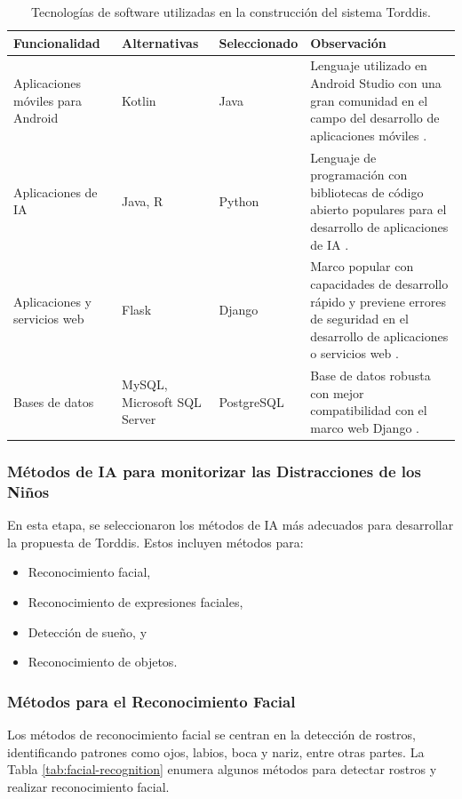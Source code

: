 \documentclass[a4paper,fleqn]{cas-sc}
\begin{document}
	\begin{table}[hbt!]
		\caption{Tecnologías de software utilizadas en la construcción del sistema Torddis.}
		\label{table:software-technologies}
		\centering
		\begin{tabular}{p{}p{}p{}p{}}
			\hline
			\multicolumn{1}{l}{\textbf{Funcionalidad}} & \multicolumn{1}{l}{\textbf{Alternativas }} & \multicolumn{1}{l}{\textbf{Seleccionado}} & \multicolumn{1}{l}{\textbf{Observación}} \\ \hline
			Aplicaciones móviles para Android & Kotlin & Java & Lenguaje utilizado en Android Studio con una gran comunidad en el campo del desarrollo de aplicaciones móviles \citep{Sharma2021Real-Time}. \\
			Aplicaciones de IA & Java, R & Python & Lenguaje de programación con bibliotecas de código abierto populares para el desarrollo de aplicaciones de IA \citep{Cai2005OnThePerformance}. \\
			Aplicaciones y servicios web & Flask & Django & Marco popular con capacidades de desarrollo rápido y previene errores de seguridad en el desarrollo de aplicaciones o servicios web \citep{Puneet2022ADjango}. \\
			Bases de datos & MySQL, Microsoft SQL Server & PostgreSQL & Base de datos robusta con mejor compatibilidad con el marco web Django \citep{Puneet2022ADjango}. \\ \hline
		\end{tabular}
	\end{table}
	
	\subsubsection*{Métodos de IA para monitorizar las Distracciones de los Niños}
	
	En esta etapa, se seleccionaron los métodos de IA más adecuados para desarrollar la propuesta de Torddis. Estos incluyen métodos para:
	\begin{itemize}
		\item Reconocimiento facial,
		\item Reconocimiento de expresiones faciales,
		\item Detección de sueño, y
		\item Reconocimiento de objetos.
	\end{itemize}
	
	\subsubsection*{Métodos para el Reconocimiento Facial}
	Los métodos de reconocimiento facial se centran en la detección de rostros, identificando patrones como ojos, labios, boca y nariz, entre otras partes. La Tabla \ref{tab:facial-recognition} enumera algunos métodos para detectar rostros y realizar reconocimiento facial.
	
\end{document}
